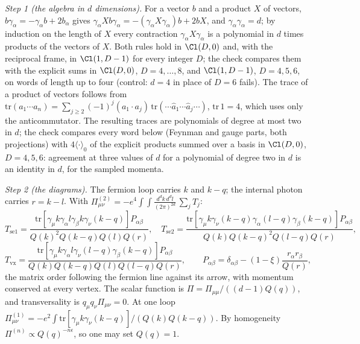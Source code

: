\emph{Step 1 (the algebra in $d$ dimensions).} For a vector $b$ and a product $X$ of vectors, $b\gamma_{\alpha} = -\gamma_{\alpha}b + 2b_{\alpha}$ gives $\gamma_{\alpha}Xb\gamma_{\alpha} = -(\gamma_{\alpha}X\gamma_{\alpha})b + 2bX$, and $\gamma_{\alpha}\gamma_{\alpha} = d$; by induction on the length of $X$ every contraction $\gamma_{\alpha}X\gamma_{\alpha}$ is a polynomial in $d$ times products of the vectors of $X$. Both rules hold in $\Cl(D, 0)$ and, with the reciprocal frame, in $\Cl(1, D-1)$ for every integer $D$; the check compares them with the explicit sums in $\Cl(D, 0)$, $D = 4, \ldots, 8$, and $\Cl(1, D-1)$, $D = 4, 5, 6$, on words of length up to four (control: $d = 4$ in place of $D = 6$ fails). The trace of a product of vectors follows from $\mathrm{tr}(a_{1}\cdots a_{n}) = \sum_{j \ge 2}(-1)^{j}(a_{1}\cdot a_{j})\,\mathrm{tr}(\cdots\hat a_{1}\cdots\hat a_{j}\cdots)$, $\mathrm{tr}\,1 = 4$, which uses only the anticommutator. The resulting traces are polynomials of degree at most two in $d$; the check compares every word below (Feynman and gauge parts, both projections) with $4\langle\cdot\rangle_{0}$ of the explicit products summed over a basis in $\Cl(D, 0)$, $D = 4, 5, 6$: agreement at three values of $d$ for a polynomial of degree two in $d$ is an identity in $d$, for the sampled momenta.

\emph{Step 2 (the diagrams).} The fermion loop carries $k$ and $k - q$; the internal photon carries $r = k - l$. With $\Pi_{\mu\nu}^{(2)} = -e^{4}\int\int \frac{d^{d}k\,d^{d}l}{(2\pi)^{2d}}\,\sum_{j}T_{j}$:
\[
T_{\mathrm{se}1} = \frac{\mathrm{tr}[\gamma_{\mu}k\gamma_{\alpha}l\gamma_{\beta}k\gamma_{\nu}(k-q)]P_{\alpha\beta}}{Q(k)^{2}Q(k-q)Q(l)Q(r)},\quad
T_{\mathrm{se}2} = \frac{\mathrm{tr}[\gamma_{\mu}k\gamma_{\nu}(k-q)\gamma_{\alpha}(l-q)\gamma_{\beta}(k-q)]P_{\alpha\beta}}{Q(k)Q(k-q)^{2}Q(l-q)Q(r)},
\]
\[
T_{\mathrm{vx}} = \frac{\mathrm{tr}[\gamma_{\mu}k\gamma_{\alpha}l\gamma_{\nu}(l-q)\gamma_{\beta}(k-q)]P_{\alpha\beta}}{Q(k)Q(k-q)Q(l)Q(l-q)Q(r)},\qquad P_{\alpha\beta} = \delta_{\alpha\beta} - (1-\xi)\frac{r_{\alpha}r_{\beta}}{Q(r)},
\]
the matrix order following the fermion line against its arrow, with momentum conserved at every vertex. The scalar function is $\Pi = \Pi_{\mu\mu}/((d-1)Q(q))$, and transversality is $q_{\mu}q_{\nu}\Pi_{\mu\nu} = 0$. At one loop $\Pi^{(1)}_{\mu\nu} = -e^{2}\int\mathrm{tr}[\gamma_{\mu}k\gamma_{\nu}(k-q)]/(Q(k)Q(k-q))$. By homogeneity $\Pi^{(n)} \propto Q(q)^{-n\epsilon}$, so one may set $Q(q) = 1$.

